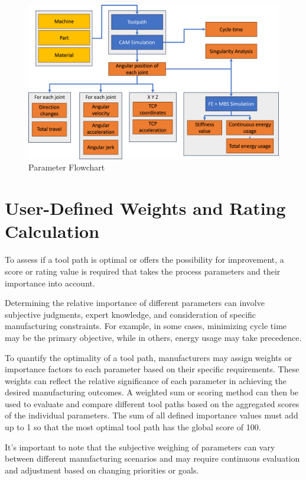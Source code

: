 \begin{figure}[H]
	\centerline{\includegraphics[scale=.55]{figures/Flow.png}}
	\caption{Parameter Flowchart}
	\label{ParamsFlow}
\end{figure}


\section{User-Defined Weights and Rating Calculation}\label{weights}
To assess if a tool path is optimal or offers the possibility for improvement, a score or rating value is required that takes the process parameters and their importance into account. 

Determining the relative importance of different parameters can involve subjective judgments, expert knowledge, and consideration of specific manufacturing constraints. For example, in some cases, minimizing cycle time may be the primary objective, while in others, energy usage may take precedence.

To quantify the optimality of a tool path, manufacturers may assign weights or importance factors to each parameter based on their specific requirements. These weights can reflect the relative significance of each parameter in achieving the desired manufacturing outcomes. A weighted sum or scoring method can then be used to evaluate and compare different tool paths based on the aggregated scores of the individual parameters. The sum of all defined importance values must add up to 1 so that the most optimal tool path has the global score of 100.

It's important to note that the subjective weighing of parameters can vary between different manufacturing scenarios and may require continuous evaluation and adjustment based on changing priorities or goals.

